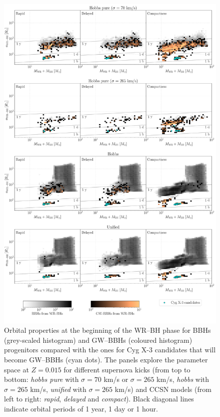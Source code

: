 \documentclass[a4paper,titlepage]{book}     	%
\begin{document}
\begin{figure}
	\centering
	\includegraphics[width=\textwidth]{./images/kickcompare_WRBH_015.pdf}	
	\caption{Orbital properties at the beginning of the WR--BH phase for BBHs (grey-scaled histogram) and GW--BBHs (coloured histogram) progenitors compared with the ones for Cyg X-3 candidates that will become GW--BBHs (cyan dots). The panels explore the parameter space at $Z=0.015$ for different supernova kicks (from top to bottom: \emph{hobbs pure} with $\sigma = 70$ km/s or $\sigma = 265$ km/s, \emph{hobbs} with $\sigma = 265$ km/s, \emph{unified} with $\sigma = 265$ km/s) and CCSN models (from left to right: \emph{rapid}, \emph{delayed} and \emph{compact}). Black diagonal lines indicate orbital periods of 1 year, 1 day or 1 hour.}\label{fig:resultsCygX3WRBHbinaries}
\end{figure}
\end{document}
